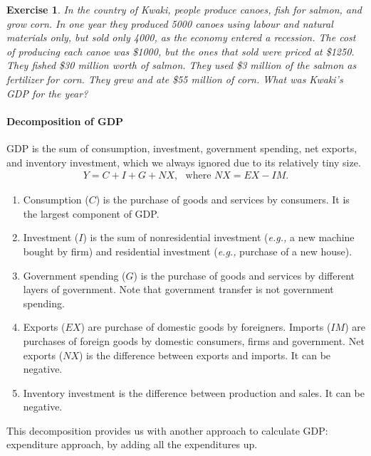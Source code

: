 \documentclass[12pt]{article}
\newtheorem{exercise}{Exercise}
\numberwithin{equation}{section}
\begin{document}
\begin{exercise}
    In the country of Kwaki, people produce canoes, fish for salmon, and grow corn. In one year they produced 5000 canoes using labour and natural materials only, but sold only 4000, as the economy entered a recession. The cost of producing each canoe was \$1000, but the ones that sold were priced at \$1250. They fished \$30 million worth of salmon. They used \$3 million of the salmon as fertilizer for corn. They grew and ate \$55 million of corn. What was Kwaki's GDP for the year?
\end{exercise}


\paragraph{Decomposition of GDP}
GDP is the sum of consumption, investment, government spending, net exports, and inventory investment, which we always ignored due to its relatively tiny size.
\begin{align*}
    Y = C + I + G + NX,\,\,\,\, \text{where } NX = EX - IM.
\end{align*}
\begin{enumerate}[label=(\arabic*)]
    \item Consumption ($C$) is the purchase of goods and services by consumers. It is the largest component of GDP.
    \item Investment ($I$) is the sum of nonresidential investment (\textit{e.g.,} a new machine bought by firm) and residential investment (\textit{e.g., }purchase of a new house). 
    \item Government spending ($G$) is the purchase of goods and services by different layers of government. Note that government transfer is not government spending.
    \item Exports ($EX$) are purchase of domestic goods by foreigners. Imports ($IM$) are purchases of foreign goods by domestic consumers, firms and government. Net exports ($NX$) is the difference between exports and imports. It can be negative. 
    \item Inventory investment is the difference between production and sales. It can be negative.
\end{enumerate}

This decomposition provides us with another approach to calculate GDP: expenditure approach, by adding all the expenditures up.
\end{document}
